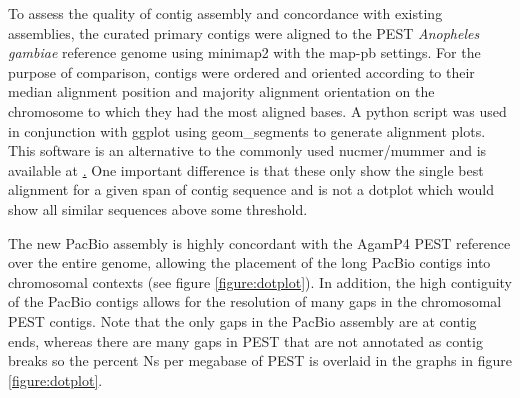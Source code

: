 \par{
To assess the quality of contig assembly and concordance with existing assemblies, the curated primary contigs were aligned to the PEST \textit{Anopheles gambiae} reference genome \cite{PEST}\cite{PEST2} using minimap2 with the map-pb settings\cite{minimap2}. For the purpose of comparison, contigs were ordered and oriented according to their median alignment position and majority alignment orientation on the chromosome to which they had the most aligned bases. A python script was used in conjunction with ggplot using geom\_segments to generate alignment plots. This software is an alternative to the commonly used nucmer/mummer\cite{mummer} and is available at \href{https://github.com/wheaton5/assembly\_comparison\_scripts}. One important difference is that these only show the single best alignment for a given span of contig sequence and is not a dotplot which would show all similar sequences above some threshold.
} 

\par{
The new PacBio assembly is highly concordant with the AgamP4 PEST reference over the entire genome, allowing the placement of the long PacBio contigs into chromosomal contexts (see figure \ref{figure:dotplot}). In addition, the high contiguity of the PacBio contigs allows for the resolution of many gaps in the chromosomal PEST contigs. Note that the only gaps in the PacBio assembly are at contig ends, whereas there are many gaps in PEST that are not annotated as contig breaks so the percent Ns per megabase of PEST is overlaid in the graphs in figure \ref{figure:dotplot}. 
}

